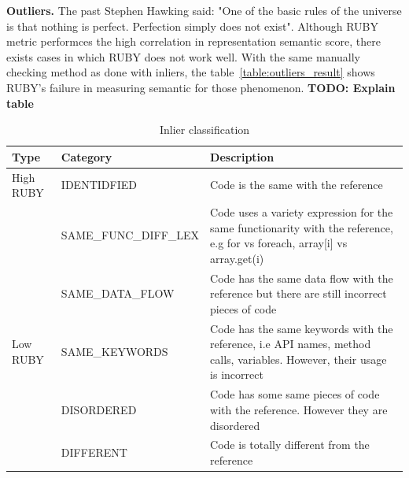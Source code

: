 \textbf{Outliers.} The past Stephen Hawking said: "One of the basic rules of the universe is that nothing is perfect. Perfection simply does not exist". Although RUBY metric performces the high correlation in representation semantic score, there exists cases in which RUBY does not work well. With the same manually checking method as done with inliers, the table~\ref{table:outliers_result} shows RUBY's failure in measuring semantic for those phenomenon.
\textbf{TODO: Explain table}
\begin{table}[]
	\centering
	\caption{Inlier classification}
	\label{table:inliers_result}
	\begin{tabular}{|m{1cm}|m{3cm}|m{4cm}}
		\hline
		Type      & Category         & Description                                                                                                                    
		\\
		\hline
		High RUBY & IDENTIDFIED           & Code is the same with the reference                                                                                             \\
		& SAME\_FUNC\_DIFF\_LEX & Code uses a variety expression for the same functionarity with the reference, e.g for vs foreach, array[i] vs array.get(i)\\
		& SAME\_DATA\_FLOW      & Code has the same data flow with the reference but there are still incorrect pieces of code                                     \\
		\hline
		Low RUBY  & SAME\_KEYWORDS        & Code has the same keywords with the reference, i.e API names, method calls, variables. However, their usage is incorrect           \\
		& DISORDERED            & Code has some same pieces of code with the reference. However they are disordered                                               \\
		& DIFFERENT             & Code is totally different from the reference \\
		\hline                                                                                   
	\end{tabular}
\end{table}



